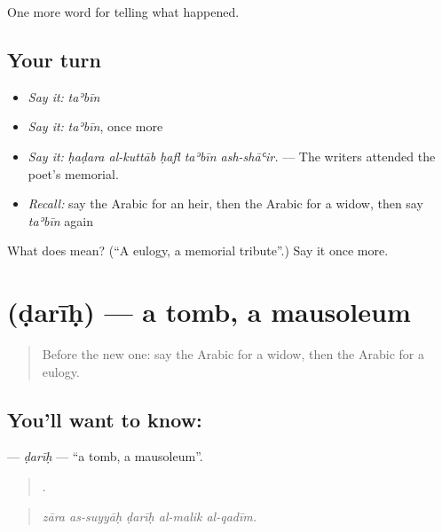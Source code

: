 \begin{grammarlens}[title={What you've built}]
One more word for telling what happened.
\end{grammarlens}

\subsection*{Your turn}
\begin{itemize}
\raggedright
  \item \emph{Say it:} \emph{taʾbīn}
  \item \emph{Say it:} \emph{taʾbīn}, once more
  \item \emph{Say it:} \emph{ḥaḍara al-kuttāb ḥafl taʾbīn ash-shāʿir.} — The writers attended the poet’s memorial.
  \item \emph{Recall:} say the Arabic for an heir, then the Arabic for a widow, then say \emph{taʾbīn} again
\end{itemize}

\begin{tcolorbox}[breakable,colback=teal!4,colframe=teal!35!black,title={Before you move on}]
What does  mean? (\textquotedblleft{}A eulogy, a memorial tribute\textquotedblright{}.) Say it once more.
\end{tcolorbox}
\section[\texorpdfstring{\ar{ضريح} (ḍarīḥ)}{ضريح (ḍarīḥ)}]{ (ḍarīḥ) — a tomb, a mausoleum}

\label{lesson:AR-C338-darih}



\begin{quote}
Before the new one: say the Arabic for a widow, then the Arabic for a eulogy.
\end{quote}

\subsection*{You'll want to know: }
\textbf{} — \emph{ḍarīḥ} — \textquotedblleft{}a tomb, a mausoleum\textquotedblright{}.

\begin{quote}
    .
\end{quote}

\begin{quote}
\emph{zāra as-suyyāḥ ḍarīḥ al-malik al-qadīm.}
\end{quote}

